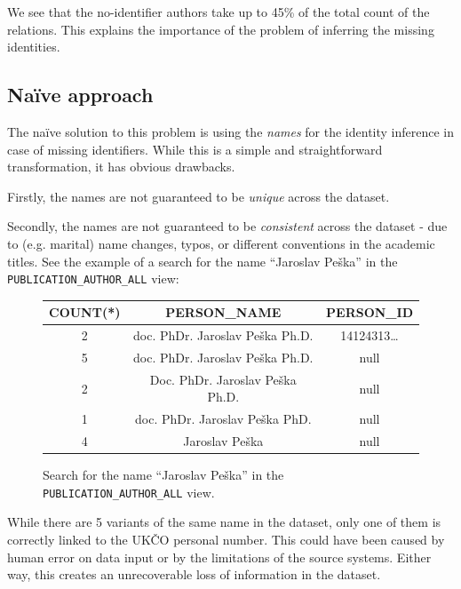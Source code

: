 We see that the no-identifier authors take up to 45\% of the total count of the relations.
This explains the importance of the problem of inferring the missing identities.

\subsection{Naïve approach}\label{sec:naive-approach}

The naïve solution to this problem is using the \textit{names} for the identity inference 
in case of missing identifiers.
While this is a simple and straightforward transformation, it has obvious drawbacks.

Firstly, the names are not guaranteed to be \textit{unique} across the dataset. 

Secondly, the names are not guaranteed to be \textit{consistent} across the dataset - due to (e.g. marital) name changes, 
typos, or different conventions in the academic titles.
See the example of a search for the name ``Jaroslav Peška'' in the \texttt{PUBLICATION\_AUTHOR\_ALL} view:

\begin{figure}[!ht]\label{fig:jaroslav-peska}
    \captionsetup{width=.9\linewidth}
    \centering
    \begin{tabular}{|c|c|c|}
    \hline
        COUNT(*) & PERSON\_NAME & PERSON\_ID \\ \hline
        2 & doc. PhDr. Jaroslav Peška Ph.D. & 14124313\dots \footnotemark \\ \hline
        5 & doc. PhDr. Jaroslav Peška Ph.D. & null \\ \hline
        2 & Doc. PhDr. Jaroslav Peška Ph.D. & null \\ \hline
        1 & doc. PhDr. Jaroslav Peška PhD. & null \\ \hline
        4 & Jaroslav Peška & null \\ \hline
    \end{tabular}
    \caption{Search for the name ``Jaroslav Peška'' in the \texttt{PUBLICATION\_AUTHOR\_ALL} view.}
\end{figure}


    While there are 5 variants of the same name in the dataset, only one of them is correctly linked to the \ac{UKČO} personal number.
This could have been caused by human error on data input or by the limitations of the source systems. 
Either way, this creates an unrecoverable loss of information in the dataset.


